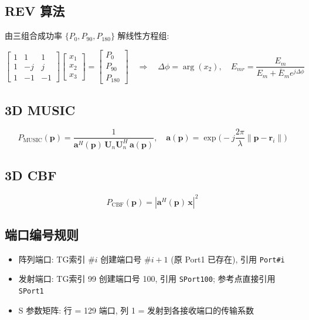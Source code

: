 \documentclass[12pt,a4paper]{ctexart}
\begin{document}
\subsection{REV 算法}

由三组合成功率 $\{P_0, P_{90}, P_{180}\}$ 解线性方程组:

\[
\begin{bmatrix} 1 & 1 & 1 \\ 1 & -j & j \\ 1 & -1 & -1 \end{bmatrix}
\begin{bmatrix} x_1 \\ x_2 \\ x_3 \end{bmatrix} =
\begin{bmatrix} P_0 \\ P_{90} \\ P_{180} \end{bmatrix}
\quad\Longrightarrow\quad
\Delta\phi = \arg(x_2),\quad
E_{mr} = \frac{E_m}{E_m + \bar{E}_m e^{j\Delta\phi}}
\]

\subsection{3D MUSIC}

\[
P_{\text{MUSIC}}(\mathbf{p}) = \frac{1}{\mathbf{a}^H(\mathbf{p})\,\mathbf{U}_n\mathbf{U}_n^H\,\mathbf{a}(\mathbf{p})}, \quad
\mathbf{a}(\mathbf{p}) = \exp\!\big(-j\frac{2\pi}{\lambda}\|\mathbf{p}-\mathbf{r}_i\|\big)
\]

\subsection{3D CBF}

\[
P_{\text{CBF}}(\mathbf{p}) = |\mathbf{a}^H(\mathbf{p})\,\mathbf{x}|^2
\]

\subsection{端口编号规则}

\begin{itemize}
    \item 阵列端口: TG索引 $\#i$ 创建端口号 $\#i+1$ (原 Port1 已存在), 引用 \texttt{Port\#i}
    \item 发射端口: TG索引 99 创建端口号 100, 引用 \texttt{SPort100}; 参考点直接引用 \texttt{SPort1}
    \item S 参数矩阵: 行 = 129 端口, 列 1 = 发射到各接收端口的传输系数
\end{itemize}
\end{document}
